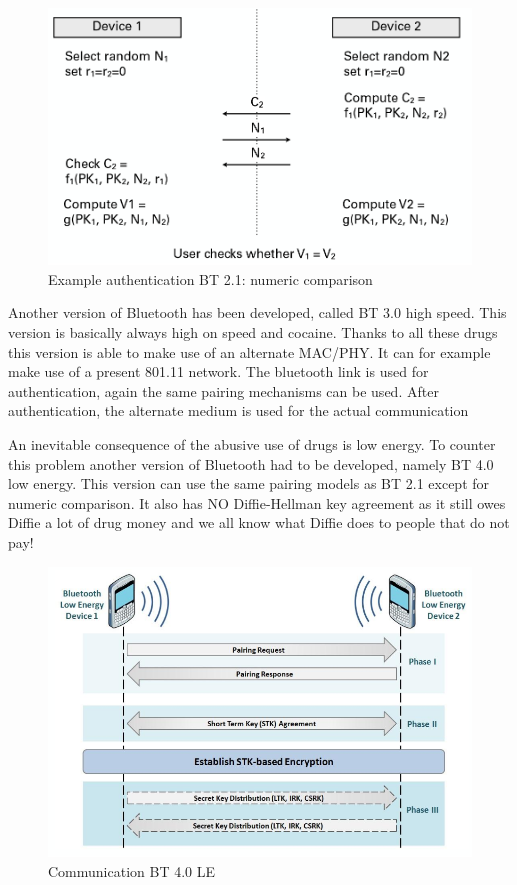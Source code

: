 \documentclass{article}
\begin{document}
\begin{figure}[!h]
\centering
\includegraphics[width=\textwidth, height=\textheight, keepaspectratio]{images/bt_communication_21.png}
\caption{Example authentication BT 2.1: numeric comparison}
\label{fig:bt_authentication_2.1}
\end{figure}

Another version of Bluetooth has been developed, called BT 3.0 high speed. This version is basically always high on speed and cocaine. Thanks to all these drugs this version is able to make use of an alternate MAC/PHY. It can for example make use of a present 801.11 network. The bluetooth link is used for authentication, again the same pairing mechanisms can be used. After authentication, the alternate medium is used for the actual communication

An inevitable consequence of the abusive use of drugs is low energy. To counter this problem another version of Bluetooth had to be developed, namely BT 4.0 low energy. This version can use the same pairing models as BT 2.1 except for numeric comparison. It also has NO Diffie-Hellman key agreement as it still owes Diffie a lot of drug money and we all know what Diffie does to people that do not pay!

\begin{figure}[!h]
\centering
\includegraphics[width=\textwidth, height=\textheight, keepaspectratio]{images/bt_communication_40.png}
\caption{Communication BT 4.0 LE}
\label{fig:bt_authentication_4.0}
\end{figure}
\end{document}
